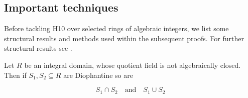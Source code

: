 \subsection{Important techniques}


Before tackling \textsc{H10} over selected rings of algebraic integers, we list
some structural results and methods used within the subsequent proofs. For
further structural results see \cite{Shlapentokh2000}.

\begin{lem}\label{lem:intersections and unions}
    Let $R$ be an integral domain, whose quotient field is not
    algebraically closed. Then if $S_1, S_2 \subseteq R$ are Diophantine so are

    \[ S_1 ∩ S_2 \quad \text{and} \quad S_1 ∪ S_2 \]
\end{lem}

